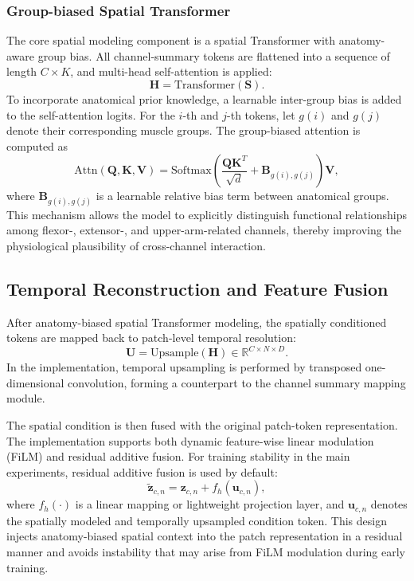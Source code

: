 \documentclass[journal]{IEEEtran}
\begin{document}
\subsubsection{Group-biased Spatial Transformer}
The core spatial modeling component is a spatial Transformer with anatomy-aware group bias. All channel-summary tokens are flattened into a sequence of length $C\times K$, and multi-head self-attention is applied:
\begin{equation}
\mathbf{H} = \mathrm{Transformer}(\mathbf{S}).
\end{equation}
To incorporate anatomical prior knowledge, a learnable inter-group bias is added to the self-attention logits. For the $i$-th and $j$-th tokens, let $g(i)$ and $g(j)$ denote their corresponding muscle groups. The group-biased attention is computed as
\begin{equation}
\mathrm{Attn}(\mathbf{Q},\mathbf{K},\mathbf{V}) = \mathrm{Softmax}\left(\frac{\mathbf{Q}\mathbf{K}^{T}}{\sqrt{d}} + \mathbf{B}_{g(i),g(j)}\right)\mathbf{V},
\end{equation}
where $\mathbf{B}_{g(i),g(j)}$ is a learnable relative bias term between anatomical groups. This mechanism allows the model to explicitly distinguish functional relationships among flexor-, extensor-, and upper-arm-related channels, thereby improving the physiological plausibility of cross-channel interaction.

\subsection{Temporal Reconstruction and Feature Fusion}
After anatomy-biased spatial Transformer modeling, the spatially conditioned tokens are mapped back to patch-level temporal resolution:
\begin{equation}
\mathbf{U} = \mathrm{Upsample}(\mathbf{H}) \in \mathbb{R}^{C \times N \times D}.
\end{equation}
In the implementation, temporal upsampling is performed by transposed one-dimensional convolution, forming a counterpart to the channel summary mapping module.

The spatial condition is then fused with the original patch-token representation. The implementation supports both dynamic feature-wise linear modulation (FiLM) and residual additive fusion. For training stability in the main experiments, residual additive fusion is used by default:
\begin{equation}
\tilde{\mathbf{z}}_{c,n} = \mathbf{z}_{c,n} + f_h(\mathbf{u}_{c,n}),
\end{equation}
where $f_h(\cdot)$ is a linear mapping or lightweight projection layer, and $\mathbf{u}_{c,n}$ denotes the spatially modeled and temporally upsampled condition token. This design injects anatomy-biased spatial context into the patch representation in a residual manner and avoids instability that may arise from FiLM modulation during early training.
\end{document}
